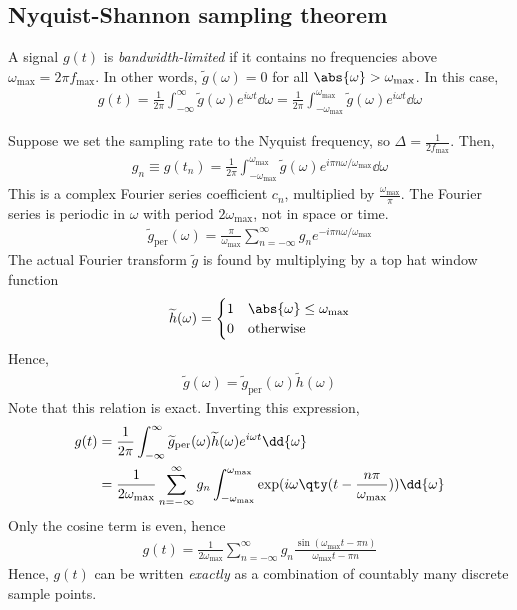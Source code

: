 \subsection{Nyquist-Shannon sampling theorem}
\begin{definition}
	A signal $g(t)$ is \textit{bandwidth-limited} if it contains no frequencies above $\omega_{\max} = 2\pi f_{\max}$.
	In other words, $\widetilde g(\omega) = 0$ for all $\abs{\omega} > \omega_{\max}$.
	In this case,
	\begin{align*}
		g(t) = \frac{1}{2\pi} \int_{-\infty}^\infty \widetilde g(\omega) e^{i\omega t} \dd{\omega} = \frac{1}{2\pi} \int_{-\omega_{\max}}^{\omega_{\max}} \widetilde g(\omega) e^{i\omega t} \dd{\omega}
	\end{align*}
\end{definition}
\noindent Suppose we set the sampling rate to the Nyquist frequency, so $\Delta = \frac{1}{2f_{\max}}$.
Then,
\begin{align*}
	g_n \equiv g(t_n) = \frac{1}{2\pi} \int_{-\omega_{\max}}^{\omega_{\max}} \widetilde g(\omega) e^{i\pi n \omega / \omega_{\max}} \dd{\omega}
\end{align*}
This is a complex Fourier series coefficient $c_n$, multiplied by $\frac{\omega_{\max}}{\pi}$.
The Fourier series is periodic in $\omega$ with period $2 \omega_{\max}$, not in space or time.
\begin{align*}
	\widetilde g_\mathrm{per}(\omega) = \frac{\pi}{\omega_{\max}} \sum_{n=-\infty}^\infty g_n e^{-i \pi n \omega / \omega_{\max}}
\end{align*}
The actual Fourier transform $\widetilde g$ is found by multiplying by a top hat window function
\begin{align*}
	\widetilde h(\omega) = \begin{cases}
		1 & \abs{\omega} \leq \omega_{\max} \\
		0 & \text{otherwise}
	\end{cases}
\end{align*}
Hence,
\begin{align*}
	\widetilde g(\omega) = \widetilde g_\mathrm{per}(\omega) \widetilde h(\omega)
\end{align*}
Note that this relation is exact.
Inverting this expression,
\begin{align*}
	g(t) & = \frac{1}{2\pi} \int_{-\infty}^\infty \widetilde g_\mathrm{per}(\omega) \widetilde h(\omega) e^{i \omega t} \dd{\omega}                                     \\
	     & = \frac{1}{2\omega_{\max}} \sum_{n=-\infty}^\infty g_n \int_{-\omega_{\max}}^{\omega_{\max}} \exp(i \omega\qty(t - \frac{n \pi}{\omega_{\max}})) \dd{\omega}
\end{align*}
Only the cosine term is even, hence
\begin{align*}
	g(t) = \frac{1}{2\omega_{\max}} \sum_{n=-\infty}^\infty g_n \frac{\sin(\omega_{\max} t - \pi n)}{\omega_{\max} t - \pi n}
\end{align*}
Hence, $g(t)$ can be written \textit{exactly} as a combination of countably many discrete sample points.

